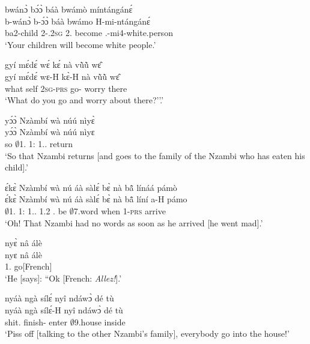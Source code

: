 \begin{exe}[(N234)]
\exN\label{n146}
  \glll bwánɔ̀ bɔ́ɔ̀ báà bwámò míntángánɛ́  \\
        b-wánɔ̀ b-ɔ́ɔ̀ báà bwámo H-mi-ntángánɛ́  \\
        ba2-child 2-{\POSS}.2\textsc{sg} 2.{\FUT} become {\OBJ}.{\LINK}-mi4-white.person \\
    \trans `Your children will become white people.'
 
\exN\label{n147}
  \glll gyí mɛ́dɛ́ wɛ́ kɛ́ nà vũ̀ũ̀ wɛ̂ \\
        gyí mɛ́dɛ́ wɛ-H kɛ̀-H nà vũ̀ũ̀ wɛ̂ \\
        what self 2\textsc{sg}-\textsc{prs} go-{\R} {\CONJ} worry there \\
    \trans `What do you go and worry about there?''.'
 
\exN\label{n148}
  \glll yɔ́ɔ̀ Nzàmbí wà núú nìyɛ̀ \\
        yɔ́ɔ̀ Nzàmbí wà núú nìyɛ \\
         so $\emptyset$1.{\PN} 1:{\ATT}  1.{\DEM}.{\DIST} return\\
    \trans `So that Nzambi returns [and goes to the family of the Nzambi who has eaten his child].'
 
\exN\label{n149}
  \glll ɛ́kɛ̀ Nzàmbí wà nú áà sàlɛ́ bɛ̀ nà bã̂ línáá pámò \\
      ɛ́kɛ̀ Nzàmbí wà nú áà sàlɛ́ bɛ̀ nà bã̂ líní a-H pámo \\
        {\EXCL} $\emptyset$1.{\PN} 1:{\ATT}  1.{\DEM}.{\DIST} 1.{\PST}2 {\NEG}.{\PST}  be {\COM} $\emptyset$7.word when 1-\textsc{prs} arrive  \\
    \trans `Oh! That Nzambi had no words as soon as he arrived [he went mad].'
 
\exN\label{n150}
  \glll nyɛ̀ nâ álè \\
       nyɛ nâ álè \\
       1.{\SBJ}  {\COMP} go[French]  \\
    \trans `He [says]: ``Ok [French: {\itshape Allez!}].'
 
\exN\label{n151}
  \glll nyáà ngà sílɛ́ nyî ndáwɔ̀ dé tù \\
       nyáà ngà sílɛ́-H nyî ndáwɔ̀ dé tù \\
       shit.{\IMP}  {\PL}  finish-{\R} enter $\emptyset$9.house {\LOC} inside  \\
    \trans `Piss off [talking to the other Nzambi's family], everybody go into the house!'
 

\end{exe}
